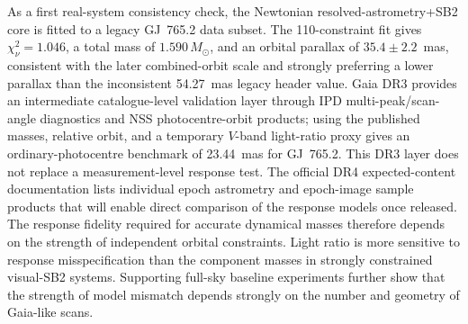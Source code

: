 \documentclass[referee]{raa}
\begin{document}
{As a first real-system consistency check, the Newtonian resolved-astrometry+SB2 core is fitted to a legacy GJ~765.2 data subset. The 110-constraint fit gives $\chi^2_\nu=1.046$, a total mass of $1.590\,M_\odot$, and an orbital parallax of $35.4\pm2.2$~mas, consistent with the later combined-orbit scale and strongly preferring a lower parallax than the inconsistent 54.27~mas legacy header value. Gaia DR3 provides an intermediate catalogue-level validation layer through IPD multi-peak/scan-angle diagnostics and NSS photocentre-orbit products; using the published masses, relative orbit, and a temporary $V$-band light-ratio proxy gives an ordinary-photocentre benchmark of 23.44~mas for GJ~765.2. This DR3 layer does not replace a measurement-level response test. The official DR4 expected-content documentation lists individual epoch astrometry and epoch-image sample products that will enable direct comparison of the response models once released.
The response fidelity required for accurate dynamical masses therefore depends on the strength of independent orbital constraints. Light ratio is more sensitive to response misspecification than the component masses in strongly constrained visual-SB2 systems. Supporting full-sky baseline experiments further show that the strength of model mismatch depends strongly on the number and geometry of Gaia-like scans.
}

\maketitle











\label{lastpage}
\end{document}
